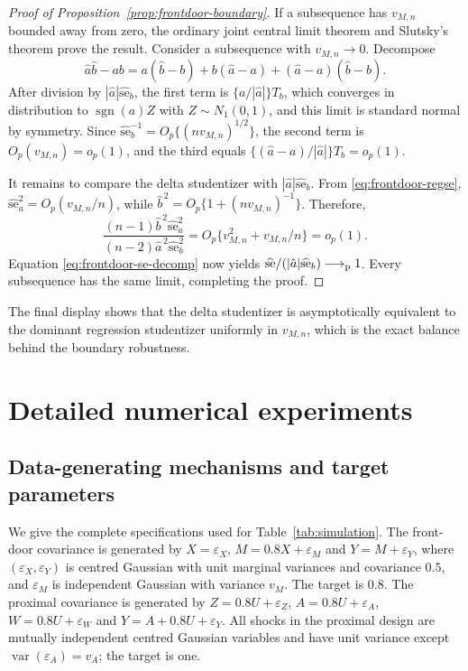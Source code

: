 \documentclass[12pt,a4paper]{article}
\theoremstyle{plain}
\theoremstyle{definition}
\newcommand{\sgn}{\operatorname{sgn}}
\newcommand{\var}{\operatorname{var}}
\newcommand{\pto}{\longrightarrow_{\rm p}}
\newcommand{\eps}{\varepsilon}
\begin{document}
\begin{proof}[Proof of Proposition~\ref{prop:frontdoor-boundary}]
    If a subsequence has $v_{M,n}$ bounded away from zero, the ordinary joint central limit theorem and Slutsky's theorem prove the result.
    Consider a subsequence with $v_{M,n}\to0$.
    Decompose
    \begin{equation*}
        \hat{a}\hat{b}-ab
        =
        a(\hat{b}-b)+b(\hat{a}-a)
        +
        (\hat{a}-a)(\hat{b}-b)
        .
    \end{equation*}
    After division by $|\hat{a}|\widehat{\mathrm{se}}_b$, the first term is $\{a/|\hat{a}|\}T_b$, which converges in distribution to $\sgn(a)Z$ with $Z\sim N_1(0,1)$, and this limit is standard normal by symmetry.
    Since $\widehat{\mathrm{se}}_b^{-1}=O_p\{(nv_{M,n})^{1/2}\}$, the second term is $O_p(v_{M,n})=o_p(1)$, and the third equals $\{(\hat{a}-a)/|\hat{a}|\}T_b=o_p(1)$.
    
    It remains to compare the delta studentizer with $|\hat{a}|\widehat{\mathrm{se}}_b$.
    From \eqref{eq:frontdoor-regse}, $\widehat{\mathrm{se}}_a^2=O_p(v_{M,n}/n)$, while $\hat{b}^{\,2}=O_p\{1+(nv_{M,n})^{-1}\}$.
    Therefore,
    \begin{equation*}
        \frac{(n-1)\hat{b}^{\,2}\widehat{\mathrm{se}}_a^2}
        {(n-2)\hat{a}^{\,2}\widehat{\mathrm{se}}_b^2}
        =
        O_p\{v_{M,n}^2+v_{M,n}/n\}
        =
        o_p(1)
        .
    \end{equation*}
    Equation \eqref{eq:frontdoor-se-decomp} now yields $\widehat{\mathrm{se}}/(|\hat{a}|\widehat{\mathrm{se}}_b)\pto1$.
    Every subsequence has the same limit, completing the proof.
\end{proof}

The final display shows that the delta studentizer is asymptotically equivalent to the dominant regression studentizer uniformly in $v_{M,n}$, which is the exact balance behind the boundary robustness.

\section{Detailed numerical experiments}
\label{supp:numerics}

\subsection{Data-generating mechanisms and target parameters}

We give the complete specifications used for Table~\ref{tab:simulation}.
The front-door covariance is generated by $X=\eps_X$, $M=0.8X+\eps_M$ and $Y=M+\eps_Y$, where $(\eps_X,\eps_Y)$ is centred Gaussian with unit marginal variances and covariance $0.5$, and $\eps_M$ is independent Gaussian with variance $v_M$.
The target is $0.8$.
The proximal covariance is generated by $Z=0.8U+\eps_Z$, $A=0.8U+\eps_A$, $W=0.8U+\eps_W$ and $Y=A+0.8U+\eps_Y$.
All shocks in the proximal design are mutually independent centred Gaussian variables and have unit variance except $\var(\eps_A)=v_A$;
the target is one.
\end{document}
